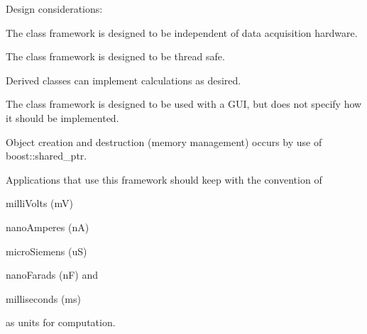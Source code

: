 Design considerations\+:~\newline

\begin{DoxyItemize}
\item The class framework is designed to be independent of data acquisition hardware.
\item The class framework is designed to be thread safe.
\item Derived classes can implement calculations as desired.
\item The class framework is designed to be used with a G\+U\+I, but does not specify how it should be implemented.
\item Object creation and destruction (memory management) occurs by use of boost\+::shared\+\_\+ptr.
\item Applications that use this framework should keep with the convention of
\begin{DoxyItemize}
\item milli\+Volts (m\+V)
\item nano\+Amperes (n\+A)
\item micro\+Siemens (u\+S)
\item nano\+Farads (n\+F) and
\item milliseconds (ms)
\end{DoxyItemize}as units for computation.
\end{DoxyItemize}

